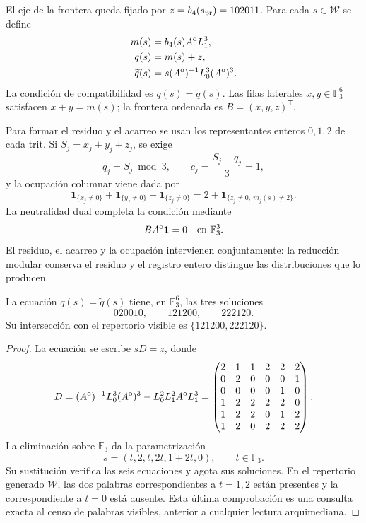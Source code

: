 El eje de la frontera queda fijado por
$z=b_4(s_{\rm pr})=102011$. Para cada $s\in\mathcal W$ se define
\begin{align}
m(s)&=b_4(s)A^{\rm o}L_1^3,\\
q(s)&=m(s)+z,\\
\widetilde q(s)&=s(A^{\rm o})^{-1}L_0^3(A^{\rm o})^3.
\label{r36c:eq:compat-datos}
\end{align}
La condición de compatibilidad es $q(s)=\widetilde q(s)$. Las filas
laterales $x,y\in\mathbb F_3^6$ satisfacen $x+y=m(s)$; la frontera
ordenada es $B=(x,y,z)^{\mathsf T}$.

Para formar el residuo y el acarreo se usan los representantes enteros
$0,1,2$ de cada trit. Si $S_j=x_j+y_j+z_j$, se exige
\[
q_j=S_j\bmod3,\qquad c_j=\frac{S_j-q_j}{3}=1,
\]
y la ocupación columnar viene dada por
\begin{equation}
\mathbf1_{\{x_j\ne0\}}+\mathbf1_{\{y_j\ne0\}}+\mathbf1_{\{z_j\ne0\}}
=2+\mathbf1_{\{z_j\ne0,\ m_j(s)\ne2\}}.
\label{r36c:eq:ocupacion}
\end{equation}
La neutralidad dual completa la condición mediante
\begin{equation}
BA^{\rm o}\mathbf1=0\quad\hbox{en }\mathbb F_3^3.
\label{r36c:eq:neutralidad}
\end{equation}
El residuo, el acarreo y la ocupación intervienen conjuntamente: la
reducción modular conserva el residuo y el registro entero distingue las
distribuciones que lo producen.

\begin{lemma}
\label{r36c:lem:compatibilidad}
La ecuación $q(s)=\widetilde q(s)$ tiene, en $\mathbb F_3^6$, las tres
soluciones
\[
020010,\qquad121200,\qquad222120.
\]
Su intersección con el repertorio visible es
$\{121200,222120\}$.
\end{lemma}
\begin{proof}
La ecuación se escribe $sD=z$, donde
\[
D=(A^{\rm o})^{-1}L_0^3(A^{\rm o})^3
   -L_0^2L_1^2A^{\rm o}L_1^3
 =\begin{pmatrix}
2&1&1&2&2&2\\0&2&0&0&0&1\\0&0&0&0&1&0\\
1&2&2&2&2&0\\1&2&2&0&1&2\\1&2&0&2&2&2
\end{pmatrix}.
\]
La eliminación sobre $\mathbb F_3$ da la parametrización
\[
s=(t,2,t,2t,1+2t,0),\qquad t\in\mathbb F_3.
\]
Su sustitución verifica las seis ecuaciones y agota sus soluciones. En
el repertorio generado $\mathcal W$, las dos palabras correspondientes a
$t=1,2$ están presentes y la correspondiente a $t=0$ está ausente. Esta
última comprobación es una consulta exacta al censo de palabras visibles,
anterior a cualquier lectura arquimediana.
\end{proof}

